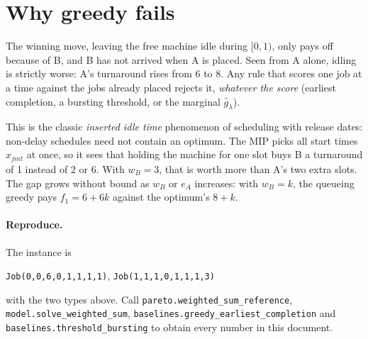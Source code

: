 \documentclass[11pt,a4paper]{article}
\newcommand{\code}[1]{\texttt{#1}}
\begin{document}
\section{Why greedy fails}

The winning move, leaving the free machine idle during $[0,1)$, only pays off
because of B, and B has not arrived when A is placed. Seen from A alone, idling
is strictly worse: A's turnaround rises from 6 to 8. Any rule that scores one
job at a time against the jobs already placed rejects it, \emph{whatever the
score} (earliest completion, a bursting threshold, or the marginal
$\hat g_\lambda$).

This is the classic \emph{inserted idle time} phenomenon of scheduling with
release dates: non-delay schedules need not contain an optimum. The MIP picks
all start times $x_{jmt}$ at once, so it sees that holding the machine for one
slot buys B a turnaround of 1 instead of 2 or 6. With $w_B=3$, that is worth
more than A's two extra slots. The gap grows without bound as $w_B$ or $e_A$
increases: with $w_B=k$, the queueing greedy pays $f_1=6+6k$ against the
optimum's $8+k$.

\paragraph{Reproduce.} The instance is
\begin{center}\small
\code{Job(0,0,6,0,1,1,1,1)}, \quad \code{Job(1,1,1,0,1,1,1,3)}
\end{center}
with the two types above. Call \code{pareto.weighted\_sum\_reference},
\code{model.solve\_weighted\_sum},
\code{baselines.greedy\_earliest\_completion} and
\code{baselines.threshold\_bursting} to obtain every number in this document.
\end{document}

